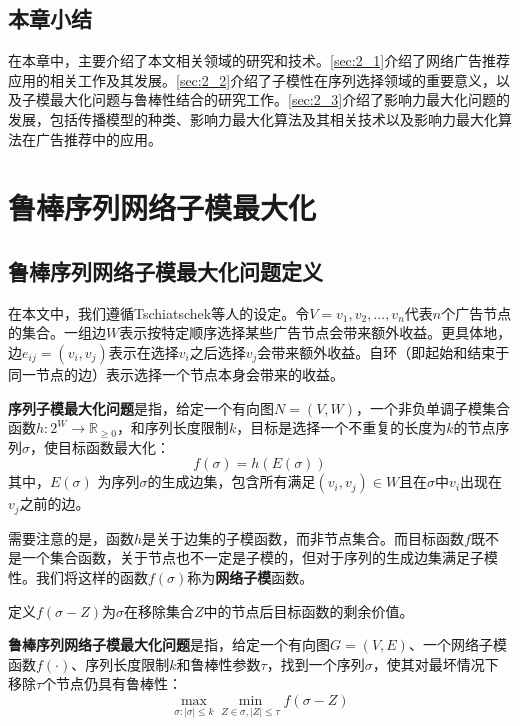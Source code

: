 \section{本章小结}

在本章中，主要介绍了本文相关领域的研究和技术。\ref{sec:2_1}介绍了网络广告推荐应用的相关工作及其发展。\ref{sec:2_2}介绍了子模性在序列选择领域的重要意义，以及子模最大化问题与鲁棒性结合的研究工作。\ref{sec:2_3}介绍了影响力最大化问题的发展，包括传播模型的种类、影响力最大化算法及其相关技术以及影响力最大化算法在广告推荐中的应用。



\chapter{鲁棒序列网络子模最大化}

\section{鲁棒序列网络子模最大化问题定义}
\label{sec:3_1}
在本文中，我们遵循Tschiatschek等人\cite{tschiatschek2017selecting}的设定。令$V={v_1,v_2,...,v_n}$代表$n$个广告节点的集合。一组边\(W\)表示按特定顺序选择某些广告节点会带来额外收益。更具体地，边\(e_{ij} = (v_i,v_j)\)表示在选择\(v_i\)之后选择\(v_j\)会带来额外收益。自环（即起始和结束于同一节点的边）表示选择一个节点本身会带来的收益。

\begin{definition}
{\bfseries 序列子模最大化问题}是指，给定一个有向图\(N = (V,W)\)，一个非负单调子模集合函数\(h: 2^W \rightarrow \mathbb{R}_{\ge 0}\)，和序列长度限制\(k\)，目标是选择一个不重复的长度为\(k\)的节点序列\(\sigma\)，使目标函数最大化：
\begin{equation}
    f(\sigma)=h(E(\sigma))
\end{equation}
\noindent 其中，\(E(\sigma)\) 为序列$\sigma$的生成边集，包含所有满足\((v_i,v_j)\in W\)且在\(\sigma\)中\(v_i\)出现在\(v_j\)之前的边。
\end{definition}

需要注意的是，函数\(h\)是关于边集的子模函数，而非节点集合。而目标函数\(f\)既不是一个集合函数，关于节点也不一定是子模的，但对于序列的生成边集满足子模性。我们将这样的函数\(f(\sigma)\)称为{\bfseries 网络子模}函数。

定义\(f(\sigma - Z)\)为$\sigma$在移除集合\(Z\)中的节点后目标函数的剩余价值。
\begin{definition}
{\bfseries 鲁棒序列网络子模最大化问题}是指，给定一个有向图\(G=(V,E)\)、一个网络子模函数\(f(\cdot)\)、序列长度限制$k$和鲁棒性参数\(\tau\)，找到一个序列\(\sigma\)，使其对最坏情况下移除\(\tau\)个节点仍具有鲁棒性：
\begin{equation}
    \max_{\sigma:|\sigma|\le k} \min_{Z\in \sigma,|Z|\le \tau} f(\sigma - Z)
\end{equation}
\end{definition}

